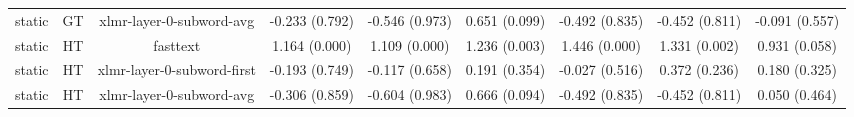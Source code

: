 \begin{sidewaystable}[htb]
\begin{tabular}{@{}ccccccccc@{}}
        static & GT & xlmr-layer-0-subword-avg & -0.233 (0.792) & -0.546 (0.973) & 0.651 (0.099) & -0.492 (0.835) & -0.452 (0.811) & -0.091 (0.557) \\
        static & HT & fasttext & 1.164 (0.000) & 1.109 (0.000) & 1.236 (0.003) & 1.446 (0.000) & 1.331 (0.002) & 0.931 (0.058) \\
        static & HT & xlmr-layer-0-subword-first & -0.193 (0.749) & -0.117 (0.658) & 0.191 (0.354) & -0.027 (0.516) & 0.372 (0.236) & 0.180 (0.325) \\
        static & HT & xlmr-layer-0-subword-avg & -0.306 (0.859) & -0.604 (0.983) & 0.666 (0.094) & -0.492 (0.835) & -0.452 (0.811) & 0.050 (0.464) \\
        \bottomrule
    \end{tabular}
\end{sidewaystable}